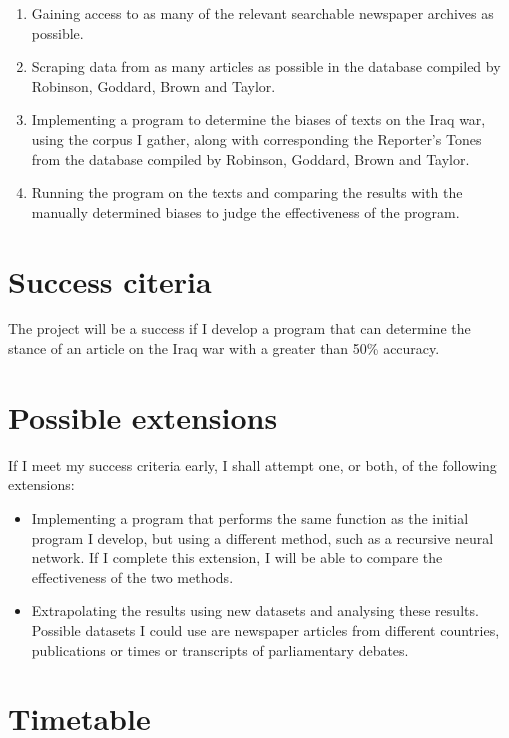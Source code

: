\documentclass[12pt,a4paper,twoside]{article}
\begin{document}
\begin{enumerate}

\item Gaining access to as many of the relevant searchable newspaper archives as possible.
\item Scraping data from as many articles as possible in the database compiled by Robinson, Goddard, Brown and Taylor.
\item Implementing a program to determine the biases of texts on the Iraq war, using the corpus I gather, along with corresponding the Reporter’s Tones from the database compiled by Robinson, Goddard, Brown and Taylor.
\item Running the program on the texts and comparing the results with the manually determined biases to judge the effectiveness of the program.

\end{enumerate}

\section*{Success citeria}
The project will be a success if I develop a program that can determine the stance of an article on the Iraq war with a greater than 50\% accuracy.

\section*{Possible extensions}
If I meet my success criteria early, I shall attempt one, or both, of the following extensions:

\begin{itemize}

\item Implementing a program that performs the same function as the initial program I develop, but using a different method, such as a recursive neural network. If I complete this extension, I will be able to compare the effectiveness of the two methods.
\item Extrapolating the results using new datasets and analysing these results. Possible datasets I could use are newspaper articles from different countries, publications or times or transcripts of parliamentary debates.

\end{itemize}



\section*{Timetable}
\end{document}
